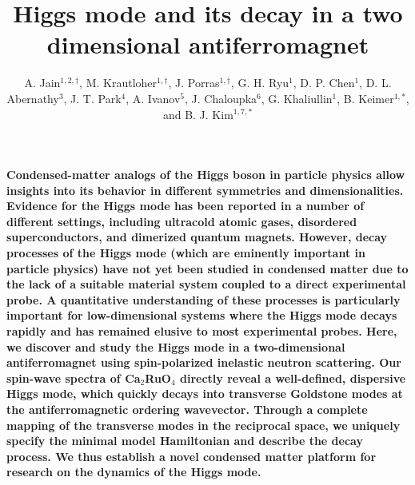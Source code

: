 \documentclass[twocolumn,prb,aps,showpacs]{revtex4-1}
\newcommand{\CRO}{{Ca$_2$RuO$_4$} }
\begin{document}
\title{Higgs mode and its decay in a two dimensional antiferromagnet} 

\author{A. Jain$^{1,2,\dagger}$, M. Krautloher$^{1,\dagger}$, J. Porras$^{1,\dagger}$,  G. H. Ryu$^1$, D. P. Chen$^1$, D. L. Abernathy$^3$, J. T. Park$^4$, A. Ivanov$^5$, J. Chaloupka$^6$, G. Khaliullin$^1$, B. Keimer$^{1,*}$, and B. J. Kim$^{1,7,*}$}


\address{$^1$Max Planck Institute for Solid State Research, Heisenbergstra\ss e 1, D-70569 Stuttgart, Germany} 
\address{$^2$Solid State Physics Division, Bhabha Atomic Research Centre, Mumbai 400085, India}
\address{$^3$Quantum Condensed Matter Division, Oak Ridge National Laboratory, Oak Ridge, Tennessee 37831, USA}
\address{$^4$Heinz Maier-Leibnitz Zentrum, TU M\"unchen, Lichtenbergstra\ss e 1, D-85747 Garching, Germany}
\address{$^5$Institut Laue-Langevin, 6, rue Jules Horowitz, BP 156, 38042 Grenoble Cedex 9, France}
\address{$^6$ Central European Institute of Technology,
Masaryk University, Kotl\'a\v{r}sk\'a 2, 61137 Brno, Czech Republic}
\address{$^7$Department of Physics, Pohang University of Science and Technology, Pohang 790-784, Republic of Korea}

\maketitle




\noindent
{\bf
Condensed-matter analogs of the Higgs boson in particle physics allow insights into its behavior in different symmetries and dimensionalities\cite{pekker_2014}. Evidence for the Higgs mode has been reported in a number of different settings, including ultracold atomic gases\cite{Endres_2012}, disordered superconductors\cite{Sherman_2015}, and dimerized quantum magnets\cite{Ruegg_2008}. However, decay processes of the Higgs mode (which are eminently important in particle physics) have not yet been studied in condensed matter due to the lack of a suitable material system coupled to a direct experimental probe. A quantitative understanding of these processes is particularly important for low-dimensional systems where the Higgs mode decays rapidly and has remained elusive to most experimental probes. Here, we discover and study the Higgs mode in a two-dimensional antiferromagnet using spin-polarized inelastic neutron scattering.  Our spin-wave spectra of \CRO directly reveal a well-defined, dispersive Higgs mode, which quickly decays into transverse Goldstone modes at the antiferromagnetic ordering wavevector. Through a complete mapping of the transverse modes in the reciprocal space, we uniquely specify the minimal model Hamiltonian and describe the decay process. We thus establish a novel condensed matter platform for research on the dynamics of the Higgs mode.
}
\end{document}
